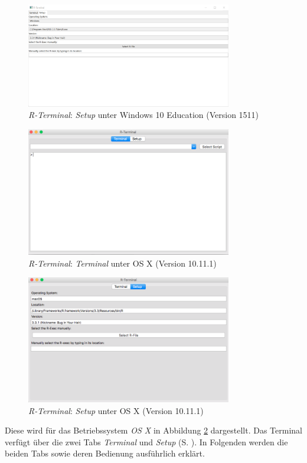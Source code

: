 \documentclass[a4paper, 12pt]{report} %
\begin{document}
\begin{figure}[htpb]
\centering
\includegraphics[width=0.8\textwidth]{Bilder/R-TerminalWindows}
\caption{\textit{R-Terminal}: \textit{Setup} unter Windows 10 Education (Version 1511)}
\label{rterminalwindows}
\end{figure}

\begin{figure}[htpb]
\centering
\includegraphics[width=0.8\textwidth]{Bilder/R-Terminal}
\caption{\textit{R-Terminal}: \textit{Terminal} unter OS X (Version 10.11.1)}
\label{rterminalmac}
\end{figure}

\begin{figure}[htpb]
\centering
\includegraphics[width=0.8\textwidth]{Bilder/rterminalsetup}
\caption{\textit{R-Terminal}: \textit{Setup} unter OS X (Version 10.11.1)}
\label{macsetup}
\end{figure}
Diese wird für das Betriebssystem \textit{OS X} in Abbildung \ref{rterminalmac} dargestellt. Das Terminal verfügt über die zwei Tabs \textit{Terminal} und \textit{Setup} (S. \pageref{macsetup}). In Folgenden werden die beiden Tabs sowie deren Bedienung ausführlich erklärt.
\end{document}
